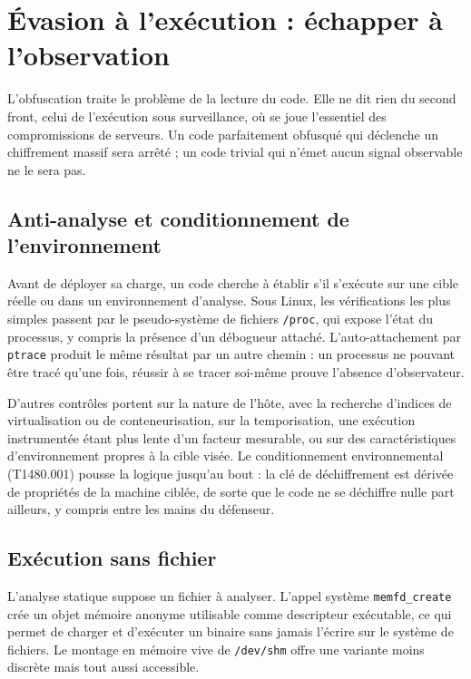 \section{Évasion à l'exécution : échapper à l'observation}
\label{sec:runtime}

L'obfuscation traite le problème de la lecture du code. Elle ne dit rien du second front, celui de l'exécution sous surveillance, où se joue l'essentiel des compromissions de serveurs. Un code parfaitement obfusqué qui déclenche un chiffrement massif sera arrêté ; un code trivial qui n'émet aucun signal observable ne le sera pas.

\subsection{Anti-analyse et conditionnement de l'environnement}

Avant de déployer sa charge, un code cherche à établir s'il s'exécute sur une cible réelle ou dans un environnement d'analyse. Sous Linux, les vérifications les plus simples passent par le pseudo-système de fichiers \texttt{/proc}, qui expose l'état du processus, y compris la présence d'un débogueur attaché. L'auto-attachement par \texttt{ptrace} produit le même résultat par un autre chemin : un processus ne pouvant être tracé qu'une fois, réussir à se tracer soi-même prouve l'absence d'observateur.

D'autres contrôles portent sur la nature de l'hôte, avec la recherche d'indices de virtualisation ou de conteneurisation, sur la temporisation, une exécution instrumentée étant plus lente d'un facteur mesurable, ou sur des caractéristiques d'environnement propres à la cible visée. Le conditionnement environnemental (T1480.001) pousse la logique jusqu'au bout : la clé de déchiffrement est dérivée de propriétés de la machine ciblée, de sorte que le code ne se déchiffre nulle part ailleurs, y compris entre les mains du défenseur.

\subsection{Exécution sans fichier}

L'analyse statique suppose un fichier à analyser. L'appel système \texttt{memfd\_create} crée un objet mémoire anonyme utilisable comme descripteur exécutable, ce qui permet de charger et d'exécuter un binaire sans jamais l'écrire sur le système de fichiers. Le montage en mémoire vive de \texttt{/dev/shm} offre une variante moins discrète mais tout aussi accessible.

